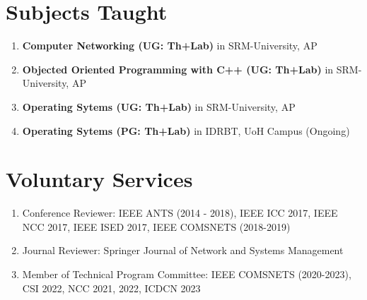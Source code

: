 \documentclass{article}
\begin{document}
\section{Subjects Taught}	
	\begin{enumerate}
	 \item {\bf Computer Networking (UG: Th+Lab)} in SRM-University, AP
	 \item {\bf Objected Oriented Programming with C++ (UG: Th+Lab)} in SRM-University, AP	 
	 \item {\bf Operating Sytems (UG: Th+Lab)} in SRM-University, AP
	 \item {\bf Operating Sytems (PG: Th+Lab)} in IDRBT, UoH Campus (Ongoing)
	\end{enumerate}
\begin{comment}
\section{Teaching Assistance}	
	\begin{enumerate}
	 \item {\bf Teaching Assistant} in IIT, Guwahati For Operating Systems (CS341) (2018 Monsoon)
	 \item {\bf Teaching Assistant} in IIT, Guwahati For Network Lab (CS343) (2016 Monsoon)
	 \item {\bf Teaching Assistant} in IIT, Guwahati For Wireless Networks (CS551) (2015 Monsoon, 2017 Monsoon)
	 \item {\bf Teaching Assistant} in IIT, Guwahati For Systems Lab (CS558) (2014 Winter,2015 Winter,2016 Winter,2018 Winter)
	 \item {\bf Teaching Assistant} in IIT, Guwahati For Programming Lab (CS513) (2013 Monsoon, 2014 Monsoon)
	 \item {\bf Teaching Assistant} in IIT, Guwahati For Computing Laboratory (CS110) (2013 Winter)
	 \item {\bf Teaching Assistant} in IIT, Guwahati For Discrete Mathematics (CS202)  (2012 Monsoon)
	\end{enumerate}
\end{comment}
\section{Voluntary Services}
  \begin{enumerate}
   \item Conference Reviewer: IEEE ANTS (2014 - 2018), IEEE ICC 2017, IEEE NCC 2017, IEEE ISED 2017, IEEE COMSNETS (2018-2019)
   \item Journal Reviewer: Springer Journal of Network and Systems Management
   \item Member of Technical Program Committee: IEEE  COMSNETS (2020-2023), CSI 2022, NCC 2021, 2022, ICDCN 2023
  \end{enumerate}
\end{document}
